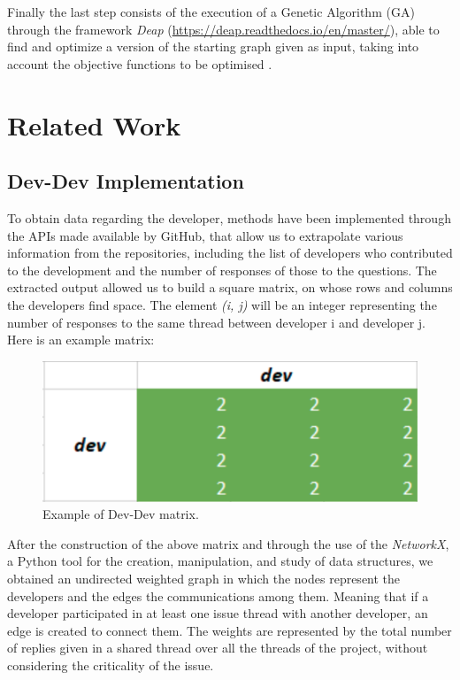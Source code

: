 \documentclass[sigconf]{acmart}
\begin{document}
Finally the last step consists of the execution of a Genetic Algorithm (GA) through the framework {\itshape Deap} (\url{https://deap.readthedocs.io/en/master/}), able to find and optimize a version of the starting graph given as input, taking into account the objective functions to be optimised \cite{palomba1}.

\section{Related Work}

\subsection{Dev-Dev Implementation}
To obtain data regarding the developer, methods have been implemented through the APIs made available by GitHub, that allow us to extrapolate various information from the repositories, including the list of developers who contributed to the development and the number of responses of those to the questions.
The extracted output allowed us to build a square matrix, on whose rows and columns the developers find space. The element {\itshape (i, j)} will be an integer representing the number of responses to the same thread between developer i and developer j. Here is an example matrix:

\begin{figure}[h]
  \centering
  \includegraphics[width=\linewidth]{img_4}
  \caption{Example of Dev-Dev matrix.}
  \Description{}
\end{figure}

After the construction of the above matrix and through the use of the {\itshape NetworkX}, a Python tool for the creation, manipulation, and study of data structures, we obtained an undirected weighted graph in which the nodes represent the developers and the edges the communications among them. Meaning that if a developer participated in at least one issue thread with another developer, an edge is created to connect them. The weights are represented by the total number of replies given in a shared thread over all the threads of the project, without considering the criticality of the issue.
\end{document}
